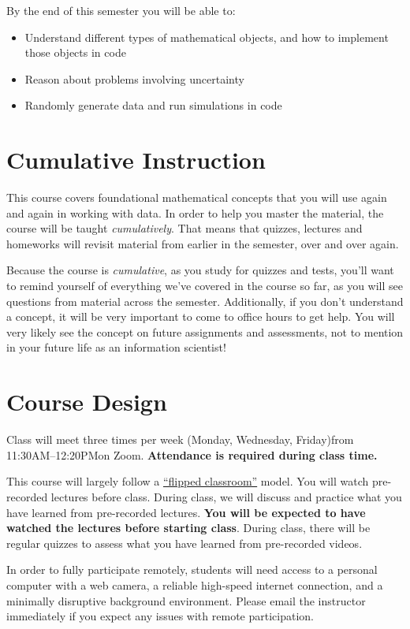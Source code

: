 \documentclass[10pt]{memoir}
\def\mymeetingdays{Monday, Wednesday, Friday}
\def\mymeetingtimes{11:30AM--12:20PM}
\begin{document}
By the end of this semester you will be able to:
\begin{itemize}
\item Understand different types of mathematical objects, and how to implement those objects in code
\item Reason about problems involving uncertainty
\item Randomly generate data and run simulations in code
\end{itemize}

\section{\textbf{Cumulative Instruction}}

This course covers foundational mathematical concepts that you will use again and again in working with data. In order to help you master the material, the course will be taught \textit{cumulatively}. That means that quizzes, lectures and homeworks will revisit material from earlier in the semester, over and over again. 

Because the course is \textit{cumulative}, as you study for quizzes and tests, you'll want to remind yourself of everything we've covered in the course so far, as you will see questions from material across the semester. Additionally, if you don't understand a concept, it will be very important to come to office hours to get help. You will very likely see the concept on future assignments and assessments, not to mention in your future life as an information scientist!

\section{\textbf{Course Design}}
Class will meet three times per week (\mymeetingdays)\space from \mymeetingtimes\space on Zoom. \textbf{Attendance is required during class time.} 

This course will largely follow a \href{https://en.wikipedia.org/wiki/Flipped_classroom}{``flipped classroom''}  model. You will watch pre-recorded lectures before class. During class, we will discuss and practice what you have learned from pre-recorded lectures. \textbf{You will be expected to have watched the lectures before starting class}. During class, there will be regular quizzes to assess what you have learned from pre-recorded videos. 

In order to fully participate remotely, students will need access to a personal computer with a web camera, a reliable high-speed internet connection, and a minimally disruptive background environment. Please email the instructor immediately if you expect any issues with remote participation.
\end{document}
